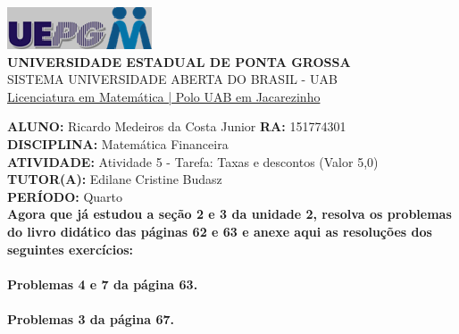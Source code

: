 \documentclass[a4paper, 12pt]{article}
\begin{document}
\begin{flushleft}\includegraphics{logo}\\
\textbf{UNIVERSIDADE ESTADUAL DE PONTA GROSSA} \\
SISTEMA UNIVERSIDADE ABERTA DO BRASIL - UAB \\
\underline{Licenciatura em Matemática | Polo UAB em Jacarezinho}\end{flushleft} 
\textbf{ALUNO:} Ricardo Medeiros da Costa Junior   \textbf{RA:} 151774301 \\
\textbf{DISCIPLINA:} Matemática Financeira \\
\textbf{ATIVIDADE:} Atividade 5 - Tarefa: Taxas e descontos (Valor 5,0) \\
\textbf{TUTOR(A):} Edilane Cristine Budasz \\
\textbf{PERÍODO:} Quarto \\

\textbf{Agora que já estudou a seção 2 e 3 da unidade 2, resolva os problemas do livro didático das páginas 62 e 63 e anexe aqui as resoluções dos seguintes exercícios:  \\\\
  Problemas 4 e 7 da página 63. \\\\
  Problemas 3 da página 67.}
\end{document}
